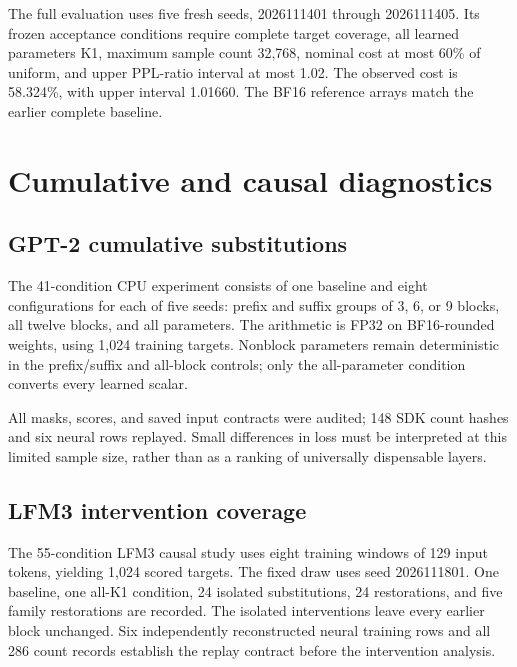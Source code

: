 \documentclass[11pt]{article}
\begin{document}
The full evaluation uses five fresh seeds, 2026111401 through 2026111405. Its frozen acceptance conditions require complete target coverage, all learned parameters K1, maximum sample count 32,768, nominal cost at most 60\% of uniform, and upper PPL-ratio interval at most 1.02. The observed cost is 58.324\%, with upper interval 1.01660. The BF16 reference arrays match the earlier complete baseline.

\section{Cumulative and causal diagnostics}
\subsection{GPT-2 cumulative substitutions}
The 41-condition CPU experiment consists of one baseline and eight configurations for each of five seeds: prefix and suffix groups of 3, 6, or 9 blocks, all twelve blocks, and all parameters. The arithmetic is FP32 on BF16-rounded weights, using 1,024 training targets. Nonblock parameters remain deterministic in the prefix/suffix and all-block controls; only the all-parameter condition converts every learned scalar.


All masks, scores, and saved input contracts were audited; 148 SDK count hashes and six neural rows replayed. Small differences in loss must be interpreted at this limited sample size, rather than as a ranking of universally dispensable layers.

\subsection{LFM3 intervention coverage}
The 55-condition LFM3 causal study uses eight training windows of 129 input tokens, yielding 1,024 scored targets. The fixed draw uses seed 2026111801. One baseline, one all-K1 condition, 24 isolated substitutions, 24 restorations, and five family restorations are recorded. The isolated interventions leave every earlier block unchanged. Six independently reconstructed neural training rows and all 286 count records establish the replay contract before the intervention analysis.
\end{document}
